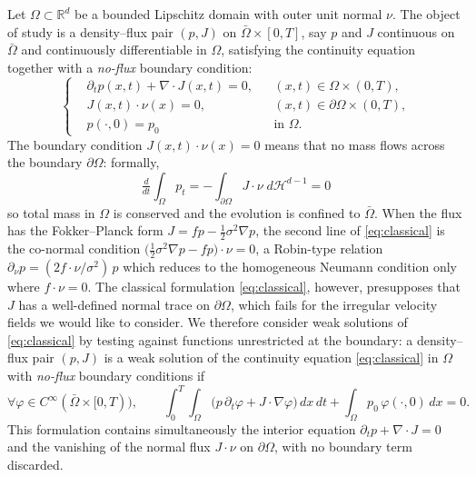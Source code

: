\documentclass[11pt]{amsart}
\theoremstyle{definition}
\newcommand{\Hd}{\mathcal{H}^{d-1}}
\newcommand{\dive}{\nabla\!\cdot}
\newcommand{\R}{\mathbb{R}}
\newcommand{\dd}{\,d}
\begin{document}
Let $\Omega \subset \R^d$ be a bounded Lipschitz domain with outer
unit normal $\nu$. The object of study is a
density--flux pair $(p, J)$ on $\bar\Omega\times[0,T]$, say $p$
and $J$ continuous on $\bar\Omega$ and continuously differentiable
in $\Omega$, satisfying the continuity equation together with a
\emph{no-flux} boundary condition:
\begin{equation}\label{eq:classical}
\left\{
\begin{aligned}
&\partial_t p(x,t) + \dive J(x,t) = 0,
&& (x,t)\in\Omega\times(0,T),\\[2pt]
&J(x,t)\cdot\nu(x) = 0,
&& (x,t)\in\partial\Omega\times(0,T),\\[2pt]
&p(\cdot,0) = p_0
&& \text{in } \Omega .
\end{aligned}
\right.
\end{equation}
The boundary condition $J(x,t)\cdot\nu(x) = 0$ means that no mass flows across the boundary
$\partial\Omega$: formally,
$$\tfrac{d}{dt}\int_\Omega p_t
= -\int_{\partial\Omega} J\cdot\nu\;d\Hd = 0$$
so total mass in $\Omega$ is conserved and the evolution is confined to
$\bar\Omega$. When the flux has the Fokker--Planck form
$J = fp - \tfrac12\sigma^2\nabla p$, the second line of
\eqref{eq:classical} is the co-normal condition
$\big(\tfrac12\sigma^2\nabla p - fp\big)\cdot\nu = 0$, a Robin-type
relation $\partial_\nu p = (2f\cdot\nu/\sigma^2)\,p$ which reduces
to the homogeneous Neumann condition only where $f\cdot\nu = 0$.
The classical formulation \eqref{eq:classical}, however,
presupposes that $J$ has a well-defined normal trace on
$\partial\Omega$, which fails for the irregular velocity fields we would like to consider. We therefore consider weak solutions of \eqref{eq:classical} 
by testing against functions unrestricted at the boundary: a density--flux pair $(p, J)$  is a weak solution of the continuity equation \eqref{eq:classical} in $\Omega$ with \emph{no-flux} boundary conditions if 
\begin{equation}\label{eq:NFintro}\forall \varphi \in C^\infty(\bar\Omega\times[0,T)),\qquad 
\int_0^T\!\!\int_\Omega \big(p\,\partial_t\varphi +
J\cdot\nabla\varphi\big)\dd x\dd t
+ \int_\Omega p_0\,\varphi(\cdot,0)\dd x = 0.
\end{equation}
This formulation contains simultaneously the interior equation
$\partial_t p + \dive J = 0$ and the vanishing of the normal flux
$J\cdot\nu$ on $\partial\Omega$, with no boundary term discarded.



\end{document}
